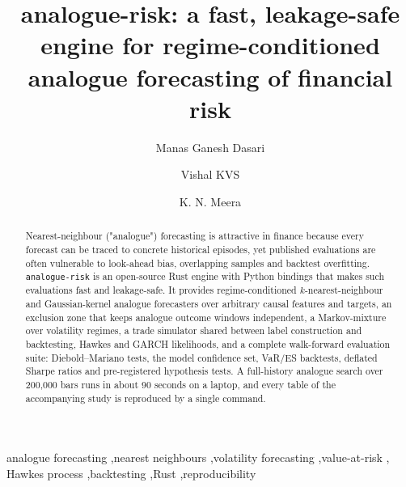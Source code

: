 \documentclass[preprint,12pt]{elsarticle}
\begin{document}
\begin{frontmatter}

\title{analogue-risk: a fast, leakage-safe engine for regime-conditioned analogue forecasting of financial risk}

\author[cse]{Manas Ganesh Dasari}
\author[cse]{Vishal KVS}
\author[math]{K. N. Meera}

\begin{abstract}
Nearest-neighbour ("analogue") forecasting is attractive in finance because every forecast can be
traced to concrete historical episodes, yet published evaluations are often vulnerable to
look-ahead bias, overlapping samples and backtest overfitting. \texttt{analogue-risk} is an
open-source Rust engine with Python bindings that makes such evaluations fast and leakage-safe.
It provides regime-conditioned $k$-nearest-neighbour and Gaussian-kernel analogue forecasters
over arbitrary causal features and targets, an exclusion zone that keeps analogue outcome
windows independent, a Markov-mixture over volatility regimes, a trade simulator shared between
label construction and backtesting, Hawkes and GARCH likelihoods, and a complete walk-forward
evaluation suite: Diebold--Mariano tests, the model confidence set, VaR/ES backtests, deflated
Sharpe ratios and pre-registered hypothesis tests. A full-history analogue search over 200,000
bars runs in about 90 seconds on a laptop, and every table of the accompanying study is
reproduced by a single command.
\end{abstract}

\begin{keyword}
analogue forecasting \sep nearest neighbours \sep volatility forecasting \sep value-at-risk \sep
Hawkes process \sep backtesting \sep Rust \sep reproducibility
\end{keyword}
\end{frontmatter}

\end{document}
